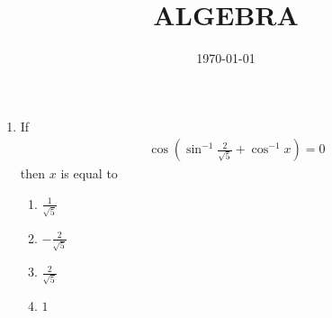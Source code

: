 \documentclass[12pt]{article}
\providecommand{\brak}[1]{\ensuremath{\left(#1\right)}}
\begin{document}
\title{ALGEBRA}
\date{ \today}
\maketitle
\begin{enumerate}
\item
If
\begin{align}
\cos\brak{\sin^{-1}{\frac{2}{\sqrt{5}}} + \cos^{-1}{x}} = 0
\end{align}
then $x$ is equal to
\begin{enumerate}[label=(\Alph*)]
	\item $\frac{1}{\sqrt{5}}$
	\item $-\frac{2}{\sqrt{5}}$
	\item $\frac{2}{\sqrt{5}}$
        \item $1$
\end{enumerate}
\end{enumerate}
\end{document}
